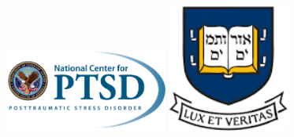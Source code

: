 \documentclass[]{betterposter}
\begin{document}
{\begin{flushright}
\includegraphics[width=0.4\textwidth]{img/NCPTSD_Logo.png}
\hfill
\includegraphics[width=0.3\textwidth]{img/Yale.png}
\end{flushright}

}
\end{document}
